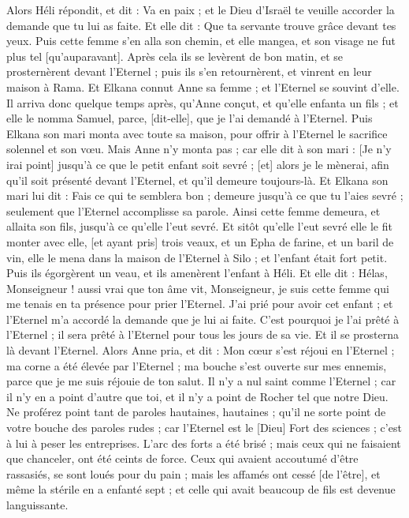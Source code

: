 \begin{multicols}{2}
Alors Héli répondit, et dit : Va en paix ; et le Dieu d'Israël te veuille accorder la demande que tu lui as faite.
Et elle dit : Que ta servante trouve grâce devant tes yeux. Puis cette femme s'en alla son chemin, et elle mangea, et son visage ne fut plus tel [qu'auparavant].
Après cela ils se levèrent de bon matin, et se prosternèrent devant l'Eternel ; puis ils s'en retournèrent, et vinrent en leur maison à Rama. Et Elkana connut Anne sa femme ; et l'Eternel se souvint d'elle.
Il arriva donc quelque temps après, qu'Anne conçut, et qu'elle enfanta un fils ; et elle le nomma Samuel, parce, [dit-elle], que je l'ai demandé à l'Eternel.
Puis Elkana son mari monta avec toute sa maison, pour offrir à l'Eternel le sacrifice solennel et son vœu.
Mais Anne n'y monta pas ; car elle dit à son mari : [Je n'y irai point] jusqu'à ce que le petit enfant soit sevré ; [et] alors je le mènerai, afin qu'il soit présenté devant l'Eternel, et qu'il demeure toujours-là.
Et Elkana son mari lui dit : Fais ce qui te semblera bon ; demeure jusqu'à ce que tu l'aies sevré ; seulement que l'Eternel accomplisse sa parole. Ainsi cette femme demeura, et allaita son fils, jusqu'à ce qu'elle l'eut sevré.
Et sitôt qu'elle l'eut sevré elle le fit monter avec elle, [et ayant pris] trois veaux, et un Epha de farine, et un baril de vin, elle le mena dans la maison de l'Eternel à Silo ; et l'enfant était fort petit.
Puis ils égorgèrent un veau, et ils amenèrent l'enfant à Héli.
Et elle dit : Hélas, Monseigneur ! aussi vrai que ton âme vit, Monseigneur, je suis cette femme qui me tenais en ta présence pour prier l'Eternel.
J'ai prié pour avoir cet enfant ; et l'Eternel m'a accordé la demande que je lui ai faite.
C'est pourquoi je l'ai prêté à l'Eternel ; il sera prêté à l'Eternel pour tous les jours de sa vie. Et il se prosterna là devant l'Eternel.
\VerseOne{}Alors Anne pria, et dit : Mon cœur s'est réjoui en l'Eternel ; ma corne a été élevée par l'Eternel ; ma bouche s'est ouverte sur mes ennemis, parce que je me suis réjouie de ton salut.
Il n'y a nul saint comme l'Eternel ; car il n'y en a point d'autre que toi, et il n'y a point de Rocher tel que notre Dieu.
Ne proférez point tant de paroles hautaines, hautaines ; qu'il ne sorte point de votre bouche des paroles rudes ; car l'Eternel est le [Dieu] Fort des sciences ; c'est à lui à peser les entreprises.
L'arc des forts a été brisé ; mais ceux qui ne faisaient que chanceler, ont été ceints de force.
Ceux qui avaient accoutumé d'être rassasiés, se sont loués pour du pain ; mais les affamés ont cessé [de l'être], et même la stérile en a enfanté sept ; et celle qui avait beaucoup de fils est devenue languissante.

\end{multicols}
